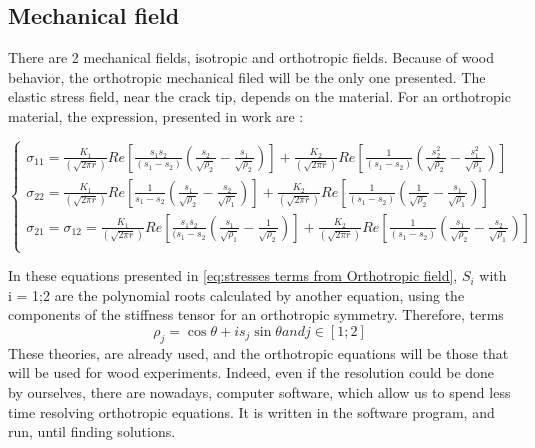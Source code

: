 \subsection{Mechanical field}

There are 2 mechanical fields, isotropic and orthotropic fields. Because of wood behavior, the orthotropic mechanical filed will be the only one presented. 
The elastic stress field, near the crack tip, depends on the material. For an orthotropic material, the expression, presented in \parencite{Reference10} work are :

\begin{equation}
	\left\{
	\begin{array}{rcr}
		\sigma_{11}=\frac{K_{1}}{(\sqrt{2 \pi r})}Re[\frac{s_{1}s_{2}}{(s_{1}-s_{2})}(\frac{s_{2}}{\sqrt{\rho_{2}}}-\frac{s_{1}}{\sqrt{\rho_{2}}})]+\frac{K_{2}}{(\sqrt{2 \pi r})}Re[\frac{1}{(s_{1}-s_{2})}(\frac{s_{2}^{2}}{\sqrt{\rho_{2}}}-\frac{s_{1}^{2}}{\sqrt{\rho_{1}}})]\\
		\sigma_{22}=\frac{K_{1}}{(\sqrt{2 \pi r})}Re[\frac{1}{s_{1}-s_{2}}(\frac{s_{1}}{\sqrt{\rho_{2}}}-\frac{s_{2}}{\sqrt{\rho_{1}}})]+\frac{K_{2}}{(\sqrt{2 \pi r})}Re[\frac{1}{(s_{1}-s_{2})}(\frac{1}{\sqrt{\rho_{2}}}-\frac{s_{1}}{\sqrt{\rho_{1}}})]\\
		\sigma_{21}=\sigma_{12}=\frac{K_{1}}{(\sqrt{2 \pi r})}Re[\frac{s_{1}s_{2}}{(s_{1}-s_{2}}(\frac{s_{1}}{\sqrt{\rho_{1}}}-\frac{1}{\sqrt{\rho_{2}}})]+\frac{K_{2}}{(\sqrt{ 2\pi r})}Re[\frac{1}{(s_{1}-s_{2})}(\frac{s_{1}}{\sqrt{\rho_{2}}}-\frac{s_{2}}{\sqrt{\rho_{1}}})] \\
	\end{array}
	\right.			
	\label{eq:stresses terms from Orthotropic field}
\end{equation} 

In these equations presented in \ref{eq:stresses terms from Orthotropic field}, $S_{i}$ with i = {1;2} are the polynomial roots calculated by another equation, using the components of the stiffness tensor for an orthotropic symmetry. 
Therefore, terms
\begin{equation}	
	\rho_{j}=\cos{\theta}+i s_{j} \sin{\theta} and j\in{[1;2]}
	\label{eq:terms present in stress equations}
\end{equation}			
These theories, are already used, and the orthotropic equations will be those that will be used for wood experiments. Indeed, even if the resolution could be done by ourselves, there are nowadays, computer software, which allow us to spend less time resolving orthotropic equations. It is written in the software program, and run, until finding solutions.

